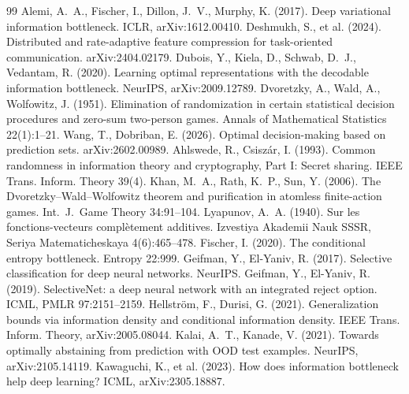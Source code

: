 \documentclass[11pt]{article}
\begin{document}

\begin{thebibliography}{99}
\small
{} Alemi, A.~A., Fischer, I., Dillon, J.~V., Murphy, K.
(2017). Deep variational information bottleneck. ICLR, arXiv:1612.00410.
 Deshmukh, S., et al. (2024). Distributed and
rate-adaptive feature compression for task-oriented communication. arXiv:2404.02179.
 Dubois, Y., Kiela, D., Schwab, D.~J., Vedantam, R.
(2020). Learning optimal representations with the decodable information bottleneck. NeurIPS,
arXiv:2009.12789.
 Dvoretzky, A., Wald, A., Wolfowitz, J. (1951).
Elimination of randomization in certain statistical decision procedures and zero-sum two-person
games. Annals of Mathematical Statistics 22(1):1--21.
 Wang, T., Dobriban, E. (2026). Optimal
decision-making based on prediction sets. arXiv:2602.00989.
 Ahlswede, R., Csiszár, I. (1993). Common
randomness in information theory and cryptography, Part I: Secret sharing. IEEE Trans. Inform.
Theory 39(4).
 Khan, M.~A., Rath, K.~P., Sun, Y. (2006). The
Dvoretzky--Wald--Wolfowitz theorem and purification in atomless finite-action games.
Int.~J.~Game Theory 34:91--104.
 Lyapunov, A.~A. (1940). Sur les fonctions-vecteurs
compl\`etement additives. Izvestiya Akademii Nauk SSSR, Seriya Matematicheskaya 4(6):465--478.
 Fischer, I. (2020). The conditional entropy bottleneck. Entropy
22:999.
 Geifman, Y., El-Yaniv, R. (2017).
Selective classification for deep neural networks. NeurIPS.
 Geifman, Y., El-Yaniv, R. (2019).
SelectiveNet: a deep neural network with an integrated reject option. ICML, PMLR
97:2151--2159.
 Hellström, F., Durisi, G. (2021).
Generalization bounds via information density and conditional information density. IEEE Trans.
Inform. Theory, arXiv:2005.08044.
 Kalai, A.~T., Kanade, V. (2021). Towards optimally
abstaining from prediction with OOD test examples. NeurIPS, arXiv:2105.14119.
 Kawaguchi, K., et al. (2023). How does information
bottleneck help deep learning? ICML, arXiv:2305.18887.

\end{thebibliography}
\end{document}
